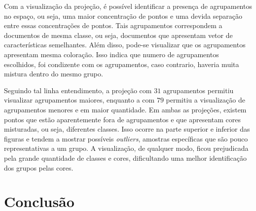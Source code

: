 \documentclass[conference]{IEEEtran}
\begin{document}
Com a visualização da projeção, é possível identificar a presença de agrupamentos no espaço, ou seja, uma maior concentração de pontos e uma devida separação entre essas concentrações de pontos. Tais agrupamentos correspondem a documentos de mesma classe, ou seja, documentos que apresentam vetor de características semelhantes. Além disso, pode-se visualizar que os agrupamentos apresentam mesma coloração. Isso indica que numero de agrupamentos escolhidos, foi condizente com os agrupamentos, caso contrario, haveria muita mistura dentro do mesmo grupo.

Seguindo tal linha entendimento, a projeção com $31$ agrupamentos permitiu visualizar agrupamentos maiores, enquanto a com $79$ permitiu a visualização de agrupamentos menores e em maior quantidade. Em ambas as projeções, existem pontos que estão aparentemente fora de agrupamentos e que apresentam cores misturadas, ou seja, diferentes classes. Isso ocorre na parte superior e inferior das figuras e tendem a mostrar possíveis \emph{outliers}, amostras específicas que são pouco representativas a um grupo. A visualização, de qualquer modo, ficou prejudicada pela grande quantidade de classes e cores, dificultando uma melhor identificação dos grupos pelas cores.

\section{Conclusão}
\end{document}
